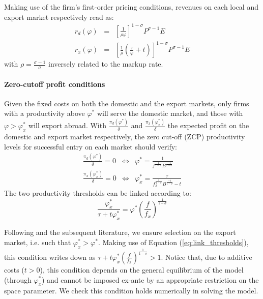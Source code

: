 \documentclass[a4paper,11pt]{article}
\begin{document}
Making use of the firm's first-order pricing conditions, revenues on each local and export market respectively read as:
\begin{eqnarray}
  r_d(\varphi) &=& \left[\frac{1}{\rho \varphi}  \right]^{1-\sigma} P^{\sigma-1} E \label{eq:rd}\\
  r_x(\varphi) &=& \left[\frac{1}{\rho}\left(\frac{\tau}{\varphi} +t\right)  \right]^{1-\sigma} P^{\sigma-1} E \label{eq:rx}
\end{eqnarray}
\noindent with $\rho =  \frac{\sigma-1}{\sigma}$ inversely related to the markup rate.

\paragraph{Zero-cutoff profit conditions} Given the fixed costs on both the domestic and the export markets, only firms with a productivity above $\varphi^\ast$ will serve the domestic market, and those with $\varphi>\varphi_x^\ast$ will export abroad. With $\frac{\pi_d(\varphi^\ast)}{\delta}$ and  $\frac{\pi_x(\varphi_x^\ast)}{\delta}$ the expected profit on the domestic and export market respectively, the zero cut-off (ZCP) productivity levels for successful entry on each market should verify:
\begin{eqnarray*}
\frac{\pi_d(\varphi^\ast)}{\delta} = 0 &\Leftrightarrow & \varphi^\ast = \frac{1}{f^{\frac{1}{1-\sigma}}B^{\frac{-1}{1-\sigma}}}\\
\frac{\pi_x(\varphi_x^\ast)}{\delta} = 0 &\Leftrightarrow & \varphi_x^\ast = \frac{\tau}{f_x^{\frac{1}{1-\sigma}}B^{\frac{-1}{1-\sigma}} -t}
\end{eqnarray*}
The two productivity thresholds can be linked according to:
\begin{equation}
\frac{\varphi_x^\ast}{\tau+t\varphi_x^\ast} = \varphi^\ast \left( \frac{f}{f_x} \right)^{\frac{1}{1-\sigma}} \label{eq:link_thresholds}
\end{equation}

Following \cite{melitz} and the subsequent literature, we ensure selection on the export market, i.e. such that $\varphi_x^\ast > \varphi^\ast$. Making use of Equation (\ref{eq:link_thresholds}), this condition writes down as $\tau+ t\varphi^\ast_x  \left( \frac{f}{f_x} \right)^{\frac{1}{1-\sigma}} >1$. Notice that, due to additive costs ($t>0$), this condition depends on the general equilibrium of the model (through $\varphi^\ast_x $) and cannot be imposed ex-ante by an appropriate restriction on the space parameter. We check this condition holds numerically in solving the model.
\end{document}

